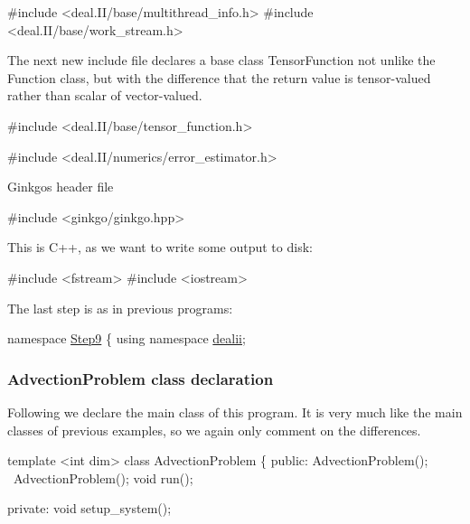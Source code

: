 \begin{DoxyCode}
\textcolor{preprocessor}{#include <deal.II/base/multithread\_info.h>}
\textcolor{preprocessor}{#include <deal.II/base/work\_stream.h>}
\end{DoxyCode}


The next new include file declares a base class {\ttfamily Tensor\+Function} not unlike the {\ttfamily Function} class, but with the difference that the return value is tensor-\/valued rather than scalar of vector-\/valued.


\begin{DoxyCode}
\textcolor{preprocessor}{#include <deal.II/base/tensor\_function.h>}

\textcolor{preprocessor}{#include <deal.II/numerics/error\_estimator.h>}
\end{DoxyCode}


Ginkgo\textquotesingle{}s header file


\begin{DoxyCode}
\textcolor{preprocessor}{#include <ginkgo/ginkgo.hpp>}
\end{DoxyCode}


This is C++, as we want to write some output to disk\+:


\begin{DoxyCode}
\textcolor{preprocessor}{#include <fstream>}
\textcolor{preprocessor}{#include <iostream>}
\end{DoxyCode}


The last step is as in previous programs\+:


\begin{DoxyCode}
\textcolor{keyword}{namespace }\hyperlink{namespaceStep9}{Step9} \{
\textcolor{keyword}{using namespace }\hyperlink{namespacedealii}{dealii};
\end{DoxyCode}


\label{_AdvectionProblemclassdeclaration}%
 \subsubsection*{Advection\+Problem class declaration}

Following we declare the main class of this program. It is very much like the main classes of previous examples, so we again only comment on the differences.


\begin{DoxyCode}
\textcolor{keyword}{template} <\textcolor{keywordtype}{int} dim>
\textcolor{keyword}{class }AdvectionProblem \{
\textcolor{keyword}{public}:
    AdvectionProblem();
    ~AdvectionProblem();
    \textcolor{keywordtype}{void} run();

\textcolor{keyword}{private}:
    \textcolor{keywordtype}{void} setup\_system();
\end{DoxyCode}


